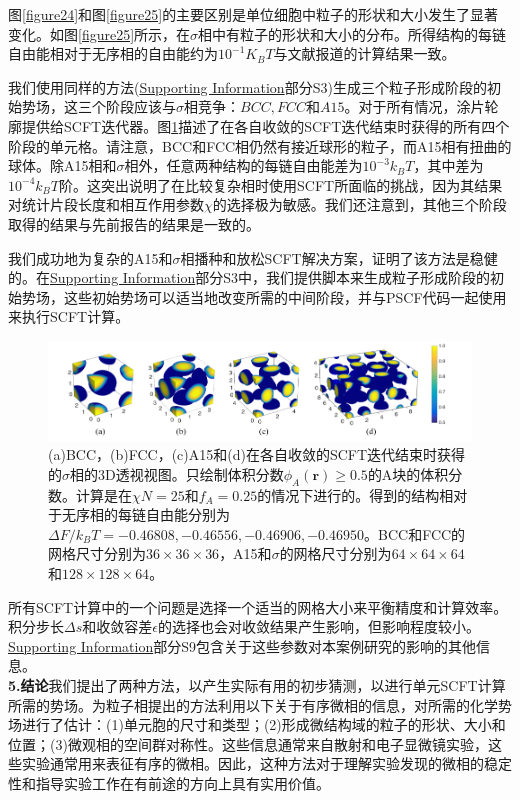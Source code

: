 \documentclass[12pt,a4paper]{article}
\begin{document}
图\ref{figure24}和图\ref{figure25}的主要区别是单位细胞中粒子的形状和大小发生了显著变化。如图\ref{figure25}所示，在$\sigma$相中有粒子的形状和大小的分布。所得结构的每链自由能相对于无序相的自由能约为$10^{-1}K_BT$与文献报道的计算结果一致。

我们使用同样的方法(\href{http://pubs.acs.org/doi/suppl/10.1021/acs.macromol.6b00107/suppl_file/ma6b00107_si_001.pdf}{Supporting Information}部分S3)生成三个粒子形成阶段的初始势场，这三个阶段应该与$\sigma$相竞争：$BCC,FCC$和$A15$。对于所有情况，涂片轮廓提供给SCFT迭代器。图\ref{figure26}描述了在各自收敛的SCFT迭代结束时获得的所有四个阶段的单元格。请注意，BCC和FCC相仍然有接近球形的粒子，而A15相有扭曲的球体。除A15相和$\sigma$相外，任意两种结构的每链自由能差为$10^{-3}k_BT$，其中差为$10^{-4}k_BT$阶。这突出说明了在比较复杂相时使用SCFT所面临的挑战，因为其结果对统计片段长度和相互作用参数$\chi$的选择极为敏感。我们还注意到，其他三个阶段取得的结果与先前报告的结果是一致的。

我们成功地为复杂的A15和$\sigma$相播种和放松SCFT解决方案，证明了该方法是稳健的。在\href{http://pubs.acs.org/doi/suppl/10.1021/acs.macromol.6b00107/suppl_file/ma6b00107_si_001.pdf}{Supporting Information}部分S3中，我们提供脚本来生成粒子形成阶段的初始势场，这些初始势场可以适当地改变所需的中间阶段，并与PSCF代码一起使用来执行SCFT计算。

\begin{figure}[H]
	\centering
	\includegraphics[scale=0.5]{./figures/26.png}
	\caption{(a)BCC，(b)FCC，(c)A15和(d)在各自收敛的SCFT迭代结束时获得的$\sigma$相的3D透视视图。只绘制体积分数$\phi _A(\mathbf{r})\geq 0.5$的A块的体积分数。计算是在$\chi N=25$和$f_A=0.25$的情况下进行的。得到的结构相对于无序相的每链自由能分别为$\Delta F/k_BT=-0.46808,-0.46556,-0.46906,-0.46950$。BCC和FCC的网格尺寸分别为$36\times 36\times 36$，A15和$\sigma$的网格尺寸分别为$64\times 64\times 64$和$128\times 128 \times 64$。}
	\label{figure26}
\end{figure}

所有SCFT计算中的一个问题是选择一个适当的网格大小来平衡精度和计算效率。积分步长$\Delta s$和收敛容差$\epsilon$的选择也会对收敛结果产生影响，但影响程度较小。\href{http://pubs.acs.org/doi/suppl/10.1021/acs.macromol.6b00107/suppl_file/ma6b00107_si_001.pdf}{Supporting Information}部分S9包含关于这些参数对本案例研究的影响的其他信息。\\
\textbf{5.结论}我们提出了两种方法，以产生实际有用的初步猜测，以进行单元SCFT计算所需的势场。为粒子相提出的方法利用以下关于有序微相的信息，对所需的化学势场进行了估计：(1)单元胞的尺寸和类型；(2)形成微结构域的粒子的形状、大小和位置；(3)微观相的空间群对称性。这些信息通常来自散射和电子显微镜实验，这些实验通常用来表征有序的微相。因此，这种方法对于理解实验发现的微相的稳定性和指导实验工作在有前途的方向上具有实用价值。
\end{document}
